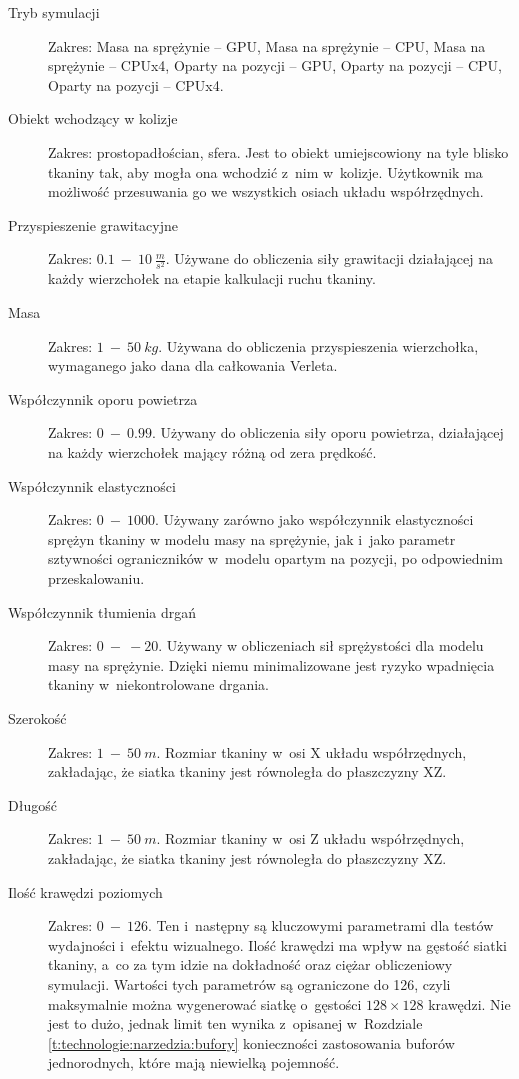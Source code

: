 		\begin{description}
			
			\item[Tryb symulacji] Zakres: Masa na sprężynie -- GPU, Masa na sprężynie -- CPU, Masa na sprężynie -- CPUx4, Oparty na pozycji -- GPU, Oparty na pozycji -- CPU, Oparty na pozycji -- CPUx4.
			
			\item[Obiekt wchodzący w kolizje] Zakres: prostopadłościan, sfera. Jest to obiekt umiejscowiony na tyle blisko tkaniny tak, aby mogła ona wchodzić z~nim w~kolizje. Użytkownik ma możliwość przesuwania go we wszystkich osiach układu współrzędnych.
			
			\item[Przyspieszenie grawitacyjne] Zakres: \(0.1\ -\ 10\ \frac{m}{s^{2}} \). Używane do obliczenia siły grawitacji działającej na każdy wierzchołek na etapie kalkulacji ruchu tkaniny.
			
			\item[Masa] Zakres: \(1\ -\ 50\ kg\). Używana do obliczenia przyspieszenia wierzchołka, wymaganego jako dana dla całkowania Verleta.
			
			\item[Współczynnik oporu powietrza] Zakres: \(0\ -\ 0.99\). Używany do obliczenia siły oporu powietrza, działającej na każdy wierzchołek mający różną od zera prędkość.
			
			\item[Współczynnik elastyczności] Zakres: \(0\ -\ 1000\). Używany zarówno jako współczynnik elastyczności sprężyn tkaniny w modelu masy na sprężynie, jak i~jako parametr sztywności ograniczników w~modelu opartym na pozycji, po odpowiednim przeskalowaniu.
			
			\item[Współczynnik tłumienia drgań] Zakres: \(0\ -\ -20\). Używany w obliczeniach sił sprężystości dla modelu masy na sprężynie. Dzięki niemu minimalizowane jest ryzyko wpadnięcia tkaniny w~niekontrolowane drgania.
			
			\item[Szerokość] Zakres: \(1\ -\ 50\ m\). Rozmiar tkaniny w~osi X układu współrzędnych, zakładając, że siatka tkaniny jest równoległa do płaszczyzny XZ.
			
			\item[Długość]Zakres: \(1\ -\ 50\ m\). Rozmiar tkaniny w~osi Z układu współrzędnych, zakładając, że siatka tkaniny jest równoległa do płaszczyzny XZ.
			
			\item[Ilość krawędzi poziomych] Zakres: \(0\ -\ 126\). Ten i~następny są kluczowymi parametrami dla testów wydajności i~efektu wizualnego. Ilość krawędzi ma wpływ na gęstość siatki tkaniny, a~co za tym idzie na dokładność oraz ciężar obliczeniowy symulacji. Wartości tych parametrów są ograniczone do 126, czyli maksymalnie można wygenerować siatkę o~gęstości \( 128 \times 128 \) krawędzi. Nie jest to dużo, jednak limit ten wynika z~opisanej w~Rozdziale \ref{t:technologie:narzedzia:bufory} konieczności zastosowania buforów jednorodnych, które mają niewielką pojemność.
			

\end{description}
